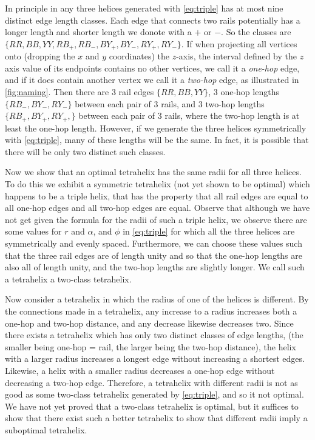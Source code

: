 \documentclass[review]{siamonline1116}
\begin{document}
In principle in any three helices generated with \cref{eq:triple}
has at most nine distinct edge length classes. Each edge that connects
two rails potentially has a longer length and shorter length we donote with
a $+$ or $-$. So the classes are $\{ RR, BB, YY, RB_+, RB_-, BY_+, BY_-, RY_+, RY_- \}$.
If when projecting all vertices onto (dropping the $x$ and $y$ coordinates) the $z$-axis, the interval
defined by the $z$ axis value of its endpoints contains no other vertices,
we call it a \emph{one-hop} edge, and if it does contain another vertex we
call it a \emph{two-hop} edge, as illustrated in \cref{fig:naming}.
Then there are 
3 rail edges $\{ RR, BB, YY\}$,
3 one-hop lengths $\{ RB_-, BY_-, RY_- \}$ between each pair of 3 rails,
and 3 two-hop
lengths $\{ RB_{+}, BY_+, RY_+, \}$ between each pair of 3 rails,
where the two-hop length is at least the one-hop length.
However, if we generate the three helices symmetrically with \cref{eq:triple},
many of these lengths will be the same.
In fact, it is possible that there
will be only two distinct such classes.

Now we show that an optimal tetrahelix has the same radii for all three helices.
To do this we exhibit a symmetric tetrahelix (not yet shown to be optimal) which
happens to be a triple helix, that has
the property that all rail edges are equal to all one-hop edges and all two-hop
edges are equal. 
Observe that although we have not get given the formula for the
radii of such a triple helix, we observe there are some values for $r$ and $\alpha$, and $\phi$
in \cref{eq:triple}
for which all the three helices are symmetrically and evenly spaced. Furthermore,
we can choose these values such that the three rail edges are of length unity and
so that the one-hop lengths are also all of length unity, and the two-hop lengths
are slightly longer. We call such a tetrahelix a two-class tetrahelix. 

Now consider a tetrahelix in which the radius of one of the helices is different.
By the connections made in a tetrahelix, any increase to a radius increases both
a one-hop and two-hop distance, and any decrease likewise decreases two.
Since there exists a tetrahelix which has only two distinct classes of edge lengths,
(the smaller being one-hop = rail, the larger being the two-hop distance), the helix
with a larger radius increases a longest edge without increasing a shortest edges.
Likewise, a helix with a smaller radius decreases a one-hop edge without decreasing
a two-hop edge.  Therefore, a tetrahelix with different radii is not as good as some two-class 
tetrahelix generated by \cref{eq:triple}, and so it not optimal. We have not yet
proved that a two-class tetrahelix is optimal, but it suffices to show that there
exist such a better tetrahelix to show that different radii imply a suboptimal
tetrahelix.
\end{document}

